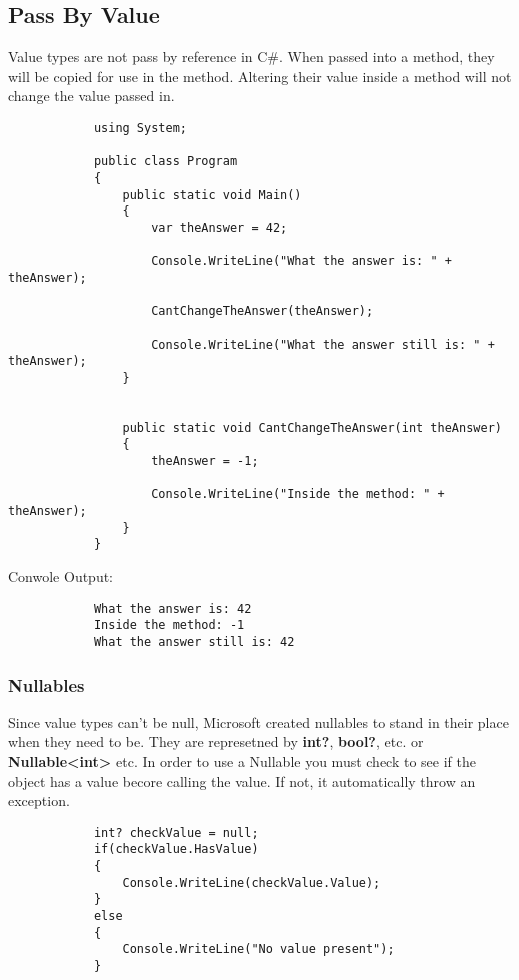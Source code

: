 \documentclass {amsart}
\begin{document}
		\subsection{Pass By Value}  Value types are not pass by reference in C\#. When passed into a method, they will be copied for use in the method.  Altering their value inside a method will not change the value passed in.

		\begin{lstlisting}
			using System;
								
			public class Program
			{
				public static void Main()
				{
					var theAnswer = 42;

					Console.WriteLine("What the answer is: " + theAnswer);
					
					CantChangeTheAnswer(theAnswer);
					
					Console.WriteLine("What the answer still is: " + theAnswer);
				}
				
				
				public static void CantChangeTheAnswer(int theAnswer)
				{
					theAnswer = -1;
					
					Console.WriteLine("Inside the method: " + theAnswer);
				}
			}
		\end{lstlisting}  
		Conwole Output:
		\begin{verbatim}
			What the answer is: 42
			Inside the method: -1
			What the answer still is: 42
		\end{verbatim}


		\subsubsection{Nullables} Since value types can't be null, Microsoft created nullables to stand in their place when they need to be.  They are represetned by {\bf int?}, {\bf bool?}, etc. or {\bf Nullable\textless int\textgreater} \space etc.  In order to use a Nullable you must check to see if the object has a value becore calling the value.  If not, it automatically throw an exception.

		\begin{lstlisting}
			int? checkValue = null;
			if(checkValue.HasValue)
			{
				Console.WriteLine(checkValue.Value);
			}
			else
			{
				Console.WriteLine("No value present");
			}
		\end{lstlisting}
\end{document}
